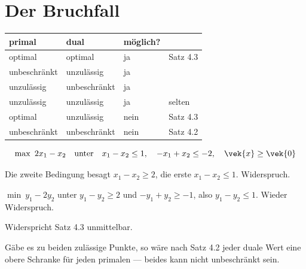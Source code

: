 \section{Der Bruchfall}

\begin{warnung}
\begin{center}
{\small
\renewcommand{\arraystretch}{1.5}
\begin{tabular}{@{}P{2.4cm}P{2.2cm}P{2.2cm}P{1.6cm}@{}}
\toprule
\textbf{primal} & \textbf{dual} & \textbf{möglich?} & \\
\midrule
optimal & optimal & \textcolor{gruen}{ja} & Satz 4.3\\
unbeschränkt & unzulässig & \textcolor{gruen}{ja} & \\
unzulässig & unbeschränkt & \textcolor{gruen}{ja} & \\
unzulässig & unzulässig & \textcolor{gruen}{ja} & \textcolor{mittel}{selten}\\
\midrule
optimal & unzulässig & \textcolor{akzent}{nein} & Satz 4.3\\
unbeschränkt & unbeschränkt & \textcolor{akzent}{nein} & Satz 4.2\\
\bottomrule
\end{tabular}}
\end{center}

\[ \max\ 2x_1-x_2 \quad\text{unter}\quad x_1-x_2 \le 1,\quad -x_1+x_2 \le -2,\quad \vek{x}\ge\vek{0} \]

 Die zweite Bedingung besagt $x_1-x_2 \ge 2$, die erste $x_1-x_2 \le 1$. Widerspruch.

 $\min\ y_1-2y_2$ unter $y_1-y_2 \ge 2$ und $-y_1+y_2 \ge -1$, also $y_1-y_2 \le 1$. Wieder Widerspruch.

\begin{center}
\begin{minipage}{0.88\textwidth}
\end{minipage}
\end{center}

 Widerspricht Satz 4.3 unmittelbar.

 Gäbe es zu beiden zulässige Punkte, so wäre nach Satz 4.2 jeder duale Wert eine obere Schranke für jeden primalen --- beides kann nicht unbeschränkt sein.
\end{warnung}


